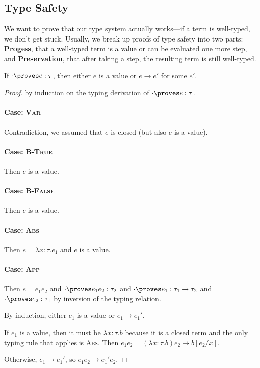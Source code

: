 \documentclass[10pt]{article}
\begin{document}
\subsection{Type Safety}

We want to prove that our type system actually works---if a term is well-typed, we don't get stuck.
Usually, we break up proofs of type safety into two parts: \textbf{Progess}, that a well-typed term is a value or can be evaluated one more step, and \textbf{Preservation}, that after taking a step, the resulting term is still well-typed.

\begin{theorem}[Progress]
    If $\cdot \proves e : \tau$, then either $e$ is a value or $e \to e'$ for some $e'$.
\end{theorem}
\begin{proof} by induction on the typing derivation of $\cdot \proves e : \tau$.

    \paragraph{Case: \textsc{Var}} Contradiction, we assumed that $e$ is closed (but also $e$ is a value).

    \paragraph{Case: \textsc{B-True}} Then $e$ is a value.
    \paragraph{Case: \textsc{B-False}} Then $e$ is a value.

    \paragraph{Case: \textsc{Abs}} Then $e = \lambda x : \tau. e_1$ and $e$ is a value.

    \paragraph{Case: \textsc{App}}

    Then $e = e_1 e_2$ and $\cdot \proves e_1 e_2 : \tau_2$ and $\cdot \proves e_1 : \tau_1 \to \tau_2$ and $\cdot \proves e_2 : \tau_1$ by inversion of the typing relation.

    By induction, either $e_1$ is a value or $e_1 \to e_1'$.

    If $e_1$ is a value, then it must be $\lambda x : \tau . b$ because it is a closed term and the only typing rule that applies is \textsc{Abs}.
    Then $e_1 e_2 = (\lambda x : \tau . b) e_2 \to b[e_2/x]$.

    Otherwise, $e_1 \to e_1'$, so $e_1 e_2 \to e_1' e_2$.
\end{proof}
\end{document}
